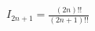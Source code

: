 \documentclass[preview]{standalone}
\begin{document}
\begin{center}
$I_{2n+1} = \frac{(2n)!!}{(2n+1)!!}$
\end{center}
\end{document}
